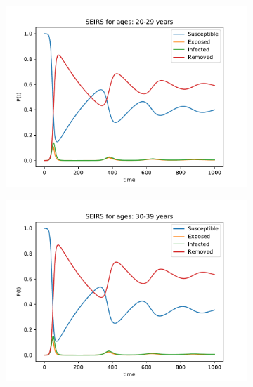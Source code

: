\begin{figure}[H]
\begin{subfigure}{0.40\textwidth}
\includegraphics[width = \textwidth]{../fig/SEIRS_20-29_n.pdf}
\caption{\protect}
\end{subfigure}
\begin{subfigure}{0.40\textwidth}
\includegraphics[width = \textwidth]{../fig/SEIRS_30-39_n.pdf}
\caption{\protect}
\end{subfigure}
\begin{subfigure}{0.40\textwidth}

\end{subfigure}
\end{figure}
